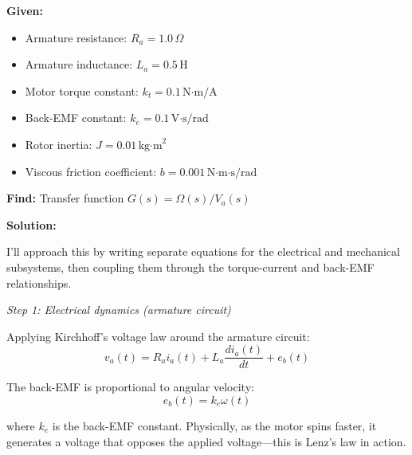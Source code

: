 \begin{example}
\begin{center}
\end{center}

\textbf{Given:}
\begin{itemize}
    \item Armature resistance: $R_a = 1.0\,\Omega$
    \item Armature inductance: $L_a = 0.5\,\text{H}$
    \item Motor torque constant: $k_t = 0.1\,\text{N·m/A}$
    \item Back-EMF constant: $k_e = 0.1\,\text{V·s/rad}$
    \item Rotor inertia: $J = 0.01\,\text{kg·m}^2$
    \item Viscous friction coefficient: $b = 0.001\,\text{N·m·s/rad}$
\end{itemize}

\textbf{Find:} Transfer function $G(s) = \Omega(s)/V_a(s)$

\textbf{Solution:}

I'll approach this by writing separate equations for the electrical and mechanical subsystems, then coupling them through the torque-current and back-EMF relationships.

\textit{Step 1: Electrical dynamics (armature circuit)}

Applying Kirchhoff's voltage law around the armature circuit:
\begin{equation}
v_a(t) = R_a i_a(t) + L_a \frac{d i_a(t)}{dt} + e_b(t)
\end{equation}

The back-EMF is proportional to angular velocity:
\begin{equation}
e_b(t) = k_e \omega(t)
\end{equation}

where $k_e$ is the back-EMF constant. Physically, as the motor spins faster, it generates a voltage that opposes the applied voltage—this is Lenz's law in action.


\end{example}

